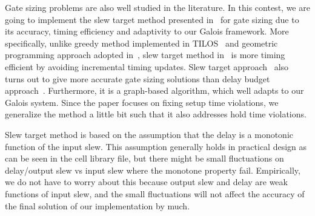 Gate sizing problems are also well studied in the literature. In this contest, we are going to implement the slew target method presented in~\cite{Held:Gate} for gate sizing due to its accuracy, timing efficiency and adaptivity to our Galois framework. More specifically, unlike greedy method implemented in TILOS~\cite{Fishburn:TILOS} and geometric programming approach adopted in~\cite{Sapatnekar:An}, slew target method in~\cite{Held:Gate} is more timing efficient by avoiding incremental timing updates. Slew target approach~\cite{Held:Gate} also turns out to give more accurate gate sizing solutions than delay budget approach~\cite{Chen:iCOACH,Dai:MOSIZ}. Furthermore, it is a graph-based algorithm, which well adapts to our Galois system. Since the paper focuses on fixing setup time violations, we generalize the method a little bit such that it also addresses hold time violations. 

Slew target method is based on the assumption that the delay is a monotonic function of the input slew. This assumption generally holds in practical design as can be seen in the cell library file, but there might be small fluctuations on delay/output slew vs input slew where the monotone property fail. Empirically, we do not have to worry about this because output slew and delay are weak functions of input slew, and the small fluctuations will not affect the accuracy of the final solution of our implementation by much.


